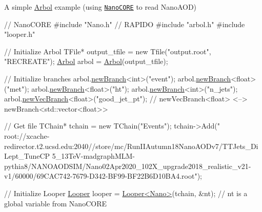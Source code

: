 \begin{DoxyEnumerate}
\item A simple \hyperlink{classArbol}{Arbol} example (using \href{https://github.com/cmstas/NanoTools}{\tt Nano\+C\+O\+RE} to read Nano\+A\+OD) 
\begin{DoxyCode}
\textcolor{comment}{// NanoCORE}
\textcolor{preprocessor}{#include "Nano.h"}
\textcolor{comment}{// RAPIDO}
\textcolor{preprocessor}{#include "arbol.h"}
\textcolor{preprocessor}{#include "looper.h"}

\textcolor{comment}{// Initialize Arbol}
TFile* output\_tfile = \textcolor{keyword}{new} Tfile(\textcolor{stringliteral}{"output.root"}, \textcolor{stringliteral}{"RECREATE"});
\hyperlink{classArbol}{Arbol} arbol = \hyperlink{classArbol}{Arbol}(output\_tfile);

\textcolor{comment}{// Initialize branches}
arbol.\hyperlink{classArbol_a552622885ffce15f1b1369fe44e729bb}{newBranch}<\textcolor{keywordtype}{int}>(\textcolor{stringliteral}{"event"});
arbol.\hyperlink{classArbol_a552622885ffce15f1b1369fe44e729bb}{newBranch}<\textcolor{keywordtype}{float}>(\textcolor{stringliteral}{"met"});
arbol.\hyperlink{classArbol_a552622885ffce15f1b1369fe44e729bb}{newBranch}<\textcolor{keywordtype}{float}>(\textcolor{stringliteral}{"ht"});
arbol.\hyperlink{classArbol_a552622885ffce15f1b1369fe44e729bb}{newBranch}<\textcolor{keywordtype}{int}>(\textcolor{stringliteral}{"n\_jets"});
arbol.\hyperlink{classArbol_a57b6cf7cca6cbb3b75bb0e0333dbe3c8}{newVecBranch}<\textcolor{keywordtype}{float}>(\textcolor{stringliteral}{"good\_jet\_pt"}); \textcolor{comment}{// newVecBranch<float> <-->
       newBranch<std::vector<float>>}

\textcolor{comment}{// Get file}
TChain* tchain = \textcolor{keyword}{new} TChain(\textcolor{stringliteral}{"Events"}); 
tchain->Add(\textcolor{stringliteral}{"
      root://xcache-redirector.t2.ucsd.edu:2040//store/mc/RunIIAutumn18NanoAODv7/TTJets\_DiLept\_TuneCP
      5\_13TeV-madgraphMLM-pythia8/NANOAODSIM/Nano02Apr2020\_102X\_upgrade2018\_realistic\_v21-v1/60000/69CAC742-7679-D342-BF99-BF22B6D10BA4.root"});

\textcolor{comment}{// Initialize Looper}
\hyperlink{classLooper}{Looper} looper = \hyperlink{classLooper}{Looper<Nano>}(tchain, &nt); \textcolor{comment}{// nt is a global variable from NanoCORE}


\end{DoxyCode}
\end{DoxyEnumerate}
